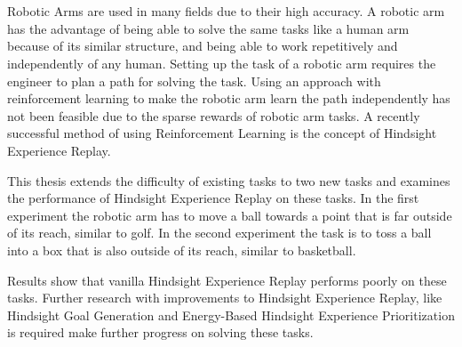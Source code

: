 \chapter{\abstractname}

Robotic Arms are used in many fields due to their high accuracy. A robotic arm has the advantage of being able to solve the same tasks like a human arm because of its similar structure, and being able to work repetitively and independently of any human. Setting up the task of a robotic arm requires the engineer to plan a path for solving the task. Using an approach with reinforcement learning to make the robotic arm learn the path independently has not been feasible due to the sparse rewards of robotic arm tasks. A recently successful method of using Reinforcement Learning is the concept of Hindsight Experience Replay. 

\vspace{0.5cm}

This thesis extends the difficulty of existing tasks to two new tasks and examines the performance of Hindsight Experience Replay on these tasks. 
In the first experiment the robotic arm has to move a ball towards a point that is far outside of its reach, similar to golf.
In the second experiment the task is to toss a ball into a box that is also outside of its reach, similar to basketball.

\vspace{0.5cm}

Results show that vanilla Hindsight Experience Replay performs poorly on these tasks. Further research with improvements to Hindsight Experience Replay, like Hindsight Goal Generation and Energy-Based Hindsight Experience Prioritization is required make further progress on solving these tasks.
